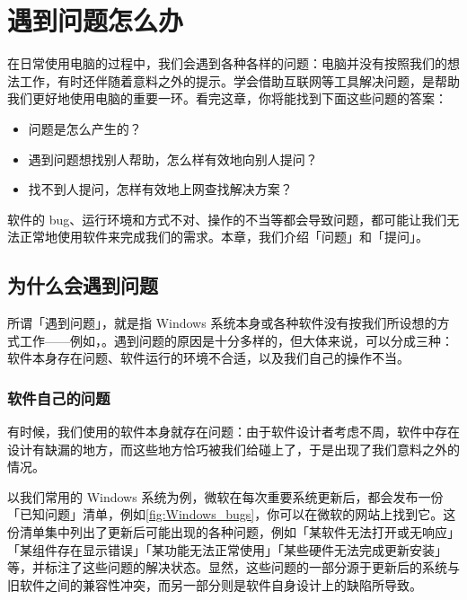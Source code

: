 \chapter{遇到问题怎么办}
\label{cha:how-to-find-solutions}

\begin{intro}
  在日常使用电脑的过程中，我们会遇到各种各样的问题：电脑并没有按照我们的想法工作，有时还伴随着意料之外的提示。学会借助互联网等工具解决问题，是帮助我们更好地使用电脑的重要一环。看完这章，你将能找到下面这些问题的答案：
  \begin{itemize}
    \item 问题是怎么产生的？
    \item 遇到问题想找别人帮助，怎么样有效地向别人提问？
    \item 找不到人提问，怎样有效地上网查找解决方案？
  \end{itemize}
\end{intro}

软件的 bug、运行环境和方式不对、操作的不当等都会导致问题，都可能让我们无法正常地使用软件来完成我们的需求。本章，我们介绍「问题」和「提问」。

\section{为什么会遇到问题}

所谓「遇到问题」，就是指 Windows 系统本身或各种软件没有按我们所设想的方式工作——例如，。遇到问题的原因是十分多样的，但大体来说，可以分成三种：软件本身存在问题、软件运行的环境不合适，以及我们自己的操作不当。

\subsection{软件自己的问题}

有时候，我们使用的软件本身就存在问题：由于软件设计者考虑不周，软件中存在设计有缺漏的地方，而这些地方恰巧被我们给碰上了，于是出现了我们意料之外的情况。

以我们常用的 Windows 系统为例，微软在每次重要系统更新后，都会发布一份「已知问题」清单，例如\autoref{fig:Windows_bugs}，你可以在微软的网站上找到它。这份清单集中列出了更新后可能出现的各种问题，例如「某软件无法打开或无响应」「某组件存在显示错误」「某功能无法正常使用」「某些硬件无法完成更新安装」等，并标注了这些问题的解决状态。显然，这些问题的一部分源于更新后的系统与旧软件之间的兼容性冲突，而另一部分则是软件自身设计上的缺陷所导致。

